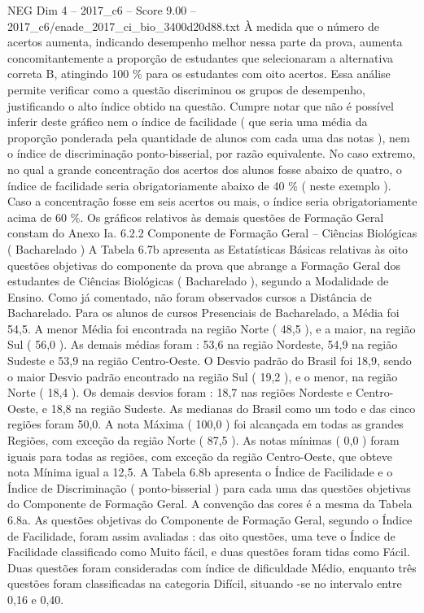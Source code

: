 \begin{textsample}{NEG Dim 4 – 2017\_c6 – Score 9.00 – 2017\_c6/enade\_2017\_ci\_bio\_3400d20d88.txt}
À medida que o número de acertos aumenta, indicando desempenho melhor nessa parte da prova, aumenta concomitantemente a proporção de estudantes que selecionaram a alternativa correta B, atingindo 100 \% para os estudantes com oito acertos.
Essa análise permite verificar como a questão discriminou os grupos de desempenho, justificando o alto índice obtido na questão.
Cumpre notar que não é possível inferir deste gráfico nem o índice de facilidade ( que seria uma média da proporção ponderada pela quantidade de alunos com cada uma das notas ), nem o índice de discriminação ponto-bisserial, por razão equivalente.
No caso extremo, no qual a grande concentração dos acertos dos alunos fosse abaixo de quatro, o índice de facilidade seria obrigatoriamente abaixo de 40 \% ( neste exemplo ).
Caso a concentração fosse em seis acertos ou mais, o índice seria obrigatoriamente acima de 60 \%.
Os gráficos relativos às demais questões de Formação Geral constam do Anexo Ia. 6.2.2 Componente de Formação Geral – Ciências Biológicas ( Bacharelado ) A Tabela 6.7b apresenta as Estatísticas Básicas relativas às oito questões objetivas do componente da prova que abrange a Formação Geral dos estudantes de Ciências Biológicas ( Bacharelado ), segundo a Modalidade de Ensino.
Como já comentado, não foram observados cursos a Distância de Bacharelado.
Para os alunos de cursos Presenciais de Bacharelado, a Média foi 54,5.
A menor Média foi encontrada na região Norte ( 48,5 ), e a maior, na região Sul ( 56,0 ).
As demais médias foram : 53,6 na região Nordeste, 54,9 na região Sudeste e 53,9 na região Centro-Oeste.
O Desvio padrão do Brasil foi 18,9, sendo o maior Desvio padrão encontrado na região Sul ( 19,2 ), e o menor, na região Norte ( 18,4 ).
Os demais desvios foram : 18,7 nas regiões Nordeste e Centro-Oeste, e 18,8 na região Sudeste.
As medianas do Brasil como um todo e das cinco regiões foram 50,0.
A nota Máxima ( 100,0 ) foi alcançada em todas as grandes Regiões, com exceção da região Norte ( 87,5 ).
As notas mínimas ( 0,0 ) foram iguais para todas as regiões, com exceção da região Centro-Oeste, que obteve nota Mínima igual a 12,5.
A Tabela 6.8b apresenta o Índice de Facilidade e o Índice de Discriminação ( ponto-bisserial ) para cada uma das questões objetivas do Componente de Formação Geral.
A convenção das cores é a mesma da Tabela 6.8a.
As questões objetivas do Componente de Formação Geral, segundo o Índice de Facilidade, foram assim avaliadas : das oito questões, uma teve o Índice de Facilidade classificado como Muito fácil, e duas questões foram tidas como Fácil.
Duas questões foram consideradas com índice de dificuldade Médio, enquanto três questões foram classificadas na categoria Difícil, situando -se no intervalo entre 0,16 e 0,40.

\end{textsample}
